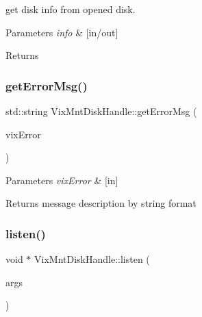 get disk info from opened disk. 


\begin{DoxyParams}{Parameters}
{\em info} & \mbox{[}in/out\mbox{]}\\
\hline
\end{DoxyParams}
\begin{DoxyReturn}{Returns}

\end{DoxyReturn}
\hypertarget{class_vix_mnt_disk_handle_af82283b2e5ae7e90d81ed9c920998b09}{}\label{class_vix_mnt_disk_handle_af82283b2e5ae7e90d81ed9c920998b09} 
\subsubsection{\texorpdfstring{get\+Error\+Msg()}{getErrorMsg()}}
{\ttfamily std\+::string Vix\+Mnt\+Disk\+Handle\+::get\+Error\+Msg (\begin{DoxyParamCaption}\item[{Vix\+Error}]{vix\+Error }\end{DoxyParamCaption})\hspace{0.3cm}{\ttfamily [static]}}


\begin{DoxyParams}{Parameters}
{\em vix\+Error} & \mbox{[}in\mbox{]}\\
\hline
\end{DoxyParams}
\begin{DoxyReturn}{Returns}
message description by string format 
\end{DoxyReturn}
\hypertarget{class_vix_mnt_disk_handle_aa6969e37bbfba234fe62aeb4bdf38fc9}{}\label{class_vix_mnt_disk_handle_aa6969e37bbfba234fe62aeb4bdf38fc9} 
\subsubsection{\texorpdfstring{listen()}{listen()}}
{\ttfamily void $\ast$ Vix\+Mnt\+Disk\+Handle\+::listen (\begin{DoxyParamCaption}\item[{void $\ast$}]{args }\end{DoxyParamCaption})}



